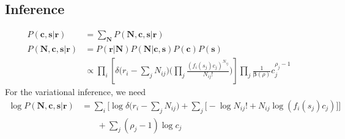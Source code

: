 \documentclass[12pt]{article}
\begin{document}
\subsection{Inference}
\begin{equation}
\begin{aligned}
P(\mathbf{c, s|r}) & = \sum_\mathbf{N} P(\mathbf{N, c, s|r}) \\
P(\mathbf{N, c, s|r}) 
& =  P(\mathbf{r|N}) P(\mathbf{N|c, s}) P(\mathbf{c}) P(\mathbf{s})\\
&\propto \prod_i \left[\delta \Big( r_i - \sum_j N_{ij} \Big) \bigg( \prod_j\frac{(f_i(s_j)c_j)^{N_{ij}}}{N_{ij}!} \bigg) \right] \prod_j \frac{1}{\mathbf{\beta}(\rho)} c_j^{\rho_j - 1} 
\end{aligned}
\end{equation}
For the variational inference, we need\\
 \begin{equation}
\begin{aligned}
\log P(\mathbf{N, c, s| r}) &= \sum_i \Big[ \log\delta \Big( r_i - \sum_j N_{ij} \Big) + \sum_j \big[-\log N_{ij}! + N_{ij} \log(f_i(s_j)c_j)\big] \Big]\\
& \phantom{{}=1} + \sum_j (\rho_j - 1)\log c_j
\end{aligned}
\end{equation}
\end{document}
